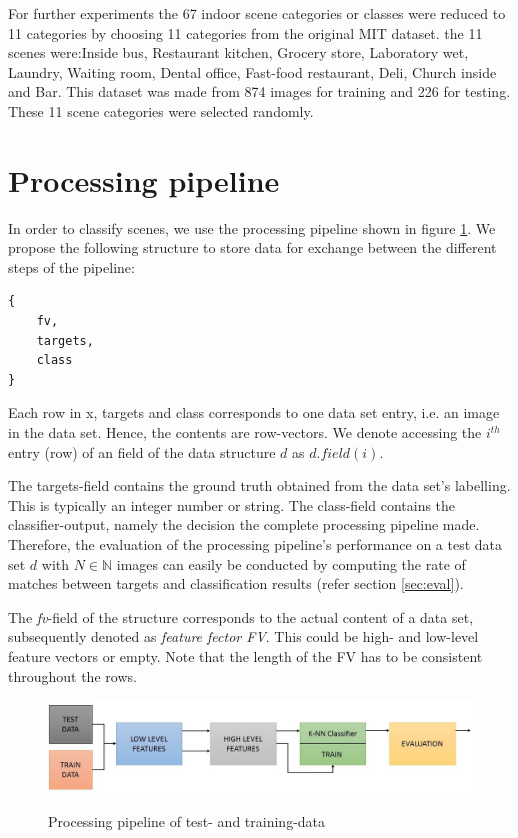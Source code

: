 \documentclass[10pt,twocolumn,letterpaper]{article}
\begin{document}
For further experiments the 67 indoor scene categories or classes were reduced to 11 categories by choosing 11 categories from the original MIT dataset. the 11 scenes were:Inside bus, Restaurant kitchen, Grocery store, Laboratory wet, Laundry, Waiting room, Dental office, Fast-food restaurant, Deli, Church inside and Bar. This dataset was made from 874 images for training and 226 for testing. These 11 scene categories were selected randomly.



\section{Processing pipeline}
In order to classify scenes, we use the processing pipeline shown in figure \ref{fig:pipeline}. We propose the following structure to store data for exchange between the different steps of the pipeline:


\begin{lstlisting}
{
	fv,
	targets,
	class
}
\end{lstlisting}

Each row in x, targets and class corresponds to one data set entry, i.e. an image in the data set. Hence, the contents are row-vectors. We denote accessing the $i^{th}$ entry (row) of an field of the data structure $d$ as $d.field(i)$. 

The targets-field contains the ground truth obtained from the data set's labelling. This is typically an integer number or string. The class-field contains the classifier-output, namely the decision the complete processing pipeline made. Therefore, the evaluation of the processing pipeline's performance on a test data set $d$ with $N \in \mathbb{N}$ images can easily be conducted by computing the rate of matches between targets and classification results (refer section \ref{sec:eval}).

The \emph{fv}-field of the structure corresponds to the actual content of a data set, subsequently denoted as \emph{feature fector FV}. This could be high- and low-level feature vectors or empty. Note that the length of the FV has to be consistent throughout the rows.


\begin{figure}
	\begin{center}
		

	\includegraphics[width=\linewidth]{img/12.jpg}
	\label{fig:pipeline}
	\caption{Processing pipeline of test- and training-data}
		\end{center}
\end{figure}
\end{document}
